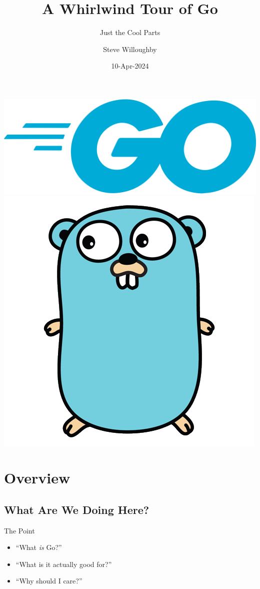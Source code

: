 \documentclass[pdf]{beamer}
\title{A Whirlwind Tour of Go}
\subtitle{Just the Cool Parts}
\author{Steve Willoughby}
\date{10-Apr-2024\\{\tiny\REV}}
\begin{document}
\begin{frame}
	\titlepage
	\begin{center}
	\includegraphics[height=.25\textheight]{go-logo}
	\includegraphics[height=.25\textheight]{gopher}
	\end{center}
\end{frame}
\section[Overview]{Overview}
\subsection{What Are We Doing Here?}
\begin{frame}{The Point}
	\begin{itemize}
		\item ``What \emph{is} Go?''
		\item ``What is it actually good for?''
		\item ``Why should I care?''
	\end{itemize}
\end{frame}
\end{document}
